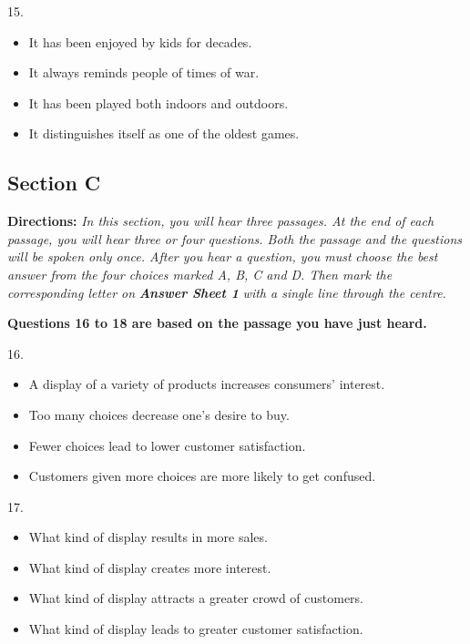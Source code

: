\documentclass[UTF8,11pt]{ctexart}
\begin{document}
15.


\begin{itemize}[leftmargin=2em,itemsep=.2em,topsep=.4em]\item[A.] It has been enjoyed by kids for decades.
\item[B.] It always reminds people of times of war.
\item[C.] It has been played both indoors and outdoors.
\item[D.] It distinguishes itself as one of the oldest games.
\end{itemize}

\subsection*{\textbf{Section C}}


\textbf{Directions:}\textit{ In this section, you will hear three passages. At the end of each passage, you will hear three or four} \textit{questions. Both the passage and the questions will be spoken only once. After you hear a question, you must} \textit{choose the best answer from the four choices marked A, B, C and D. Then mark the corresponding letter on} \textbf{\textit{Answer Sheet 1}}\textit{ with a single line through the centre.}


\textbf{Questions 16 to 18 are based on the passage you have just heard.}


16.


\begin{itemize}[leftmargin=2em,itemsep=.2em,topsep=.4em]\item[A.] A display of a variety of products increases consumers’ interest.
\item[B.] Too many choices decrease one’s desire to buy.
\item[C.] Fewer choices lead to lower customer satisfaction.
\item[D.] Customers given more choices are more likely to get confused.
\end{itemize}

17.


\begin{itemize}[leftmargin=2em,itemsep=.2em,topsep=.4em]\item[A.] What kind of display results in more sales.
\item[B.] What kind of display creates more interest.
\item[C.] What kind of display attracts a greater crowd of customers.
\item[D.] What kind of display leads to greater customer satisfaction.
\end{itemize}
\end{document}
